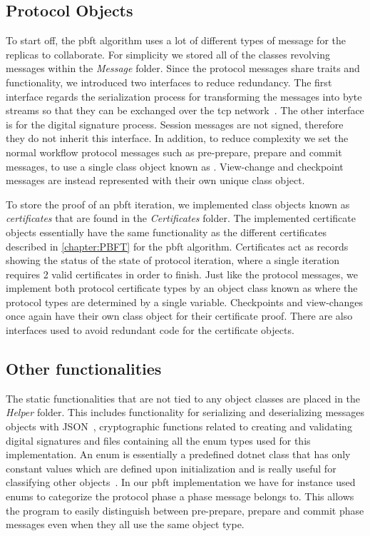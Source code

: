 
\subsection{Protocol Objects}
To start off, the \ac{pbft} algorithm uses a lot of different types of message for the replicas to collaborate. For simplicity we stored all of the classes revolving messages within the \emph{Message} folder. Since the protocol messages share traits and functionality, we introduced two interfaces to reduce redundancy. The first interface regards the serialization process for transforming the messages into byte streams so that they can be exchanged over the \ac{tcp} network~\cite{WEB:tcp}. The other interface is for the digital signature process. Session messages are not signed, therefore they do not inherit this interface. In addition, to reduce complexity we set the normal workflow protocol messages such as pre-prepare, prepare and commit messages, to use a single class object known as . View-change and checkpoint messages are instead represented with their own unique class object.

To store the proof of an \ac{pbft} iteration, we implemented class objects known as \emph{certificates} that are found in the \emph{Certificates} folder. The implemented certificate objects essentially have the same functionality as the different certificates described in \autoref{chapter:PBFT} for the \ac{pbft} algorithm. Certificates act as records showing the status of the state of protocol iteration, where a single iteration requires 2 valid certificates in order to finish. Just like the protocol messages, we implement both protocol certificate types by an object class known as  where the protocol types are determined by a single variable. Checkpoints and view-changes once again have their own class object for their certificate proof. There are also interfaces used to avoid redundant code for the certificate objects.

\subsection{Other functionalities}
The static functionalities that are not tied to any object classes are placed in the \emph{Helper} folder. This includes functionality for serializing and deserializing messages objects with JSON~\cite{WEB:NewJSON}, cryptographic functions related to creating and validating digital signatures and files containing all the enum types used for this implementation. An enum is essentially a predefined dotnet class that has only constant values which are defined upon initialization and is really useful for classifying other objects~\cite{WEB:Enum}. In our \ac{pbft} implementation we have for instance used enums to categorize the protocol phase a phase message belongs to. This allows the program to easily distinguish between pre-prepare, prepare and commit phase messages even when they all use the same object type.

